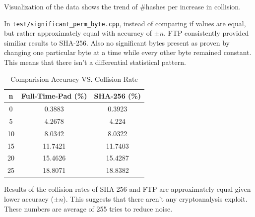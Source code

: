 \documentclass[11pt]{article}
\theoremstyle{definition}
\theoremstyle{remark}
\begin{document}
Visualization of the data shows the trend of \#hashes per increase in collision.

In \texttt{test/significant\_perm\_byte.cpp}, instead of comparing if values are equal, but rather approximately equal with accuracy of $\pm n$. FTP consistently provided similiar results to SHA-256. Also no significant bytes present as proven by changing one particular byte at a time while every other byte remained constant. This means that there isn't a differential statistical pattern.

\begin{table}[H]
\centering
\begin{tabular}{|c|c|c|}
\hline
\textbf{n} & \textbf{Full-Time-Pad (\%)} & \textbf{SHA-256 (\%)} \\
\hline
		0 & 0.3883 & 0.3923 \\
\hline
		5 & 4.2678 & 4.224 \\
\hline
		10 & 8.0342 & 8.0322 \\
\hline
		15 & 11.7421 & 11.7403 \\
\hline
		20 & 15.4626 & 15.4287 \\
\hline
		25 & 18.8071 & 18.8382 \\
\hline
\end{tabular}
\caption{Comparision Accuracy VS. Collision Rate}
\end{table}

Results of the collision rates of SHA-256 and FTP are approximately equal given lower accuracy ($\pm n$). This suggests that there aren't any cryptoanalysis exploit. These numbers are average of 255 tries to reduce noise. 
\end{document}
